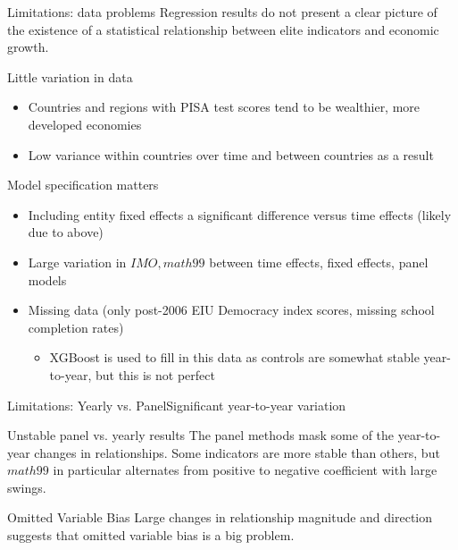 \documentclass[10pt]{beamer}
\begin{document}
\begin{frame}{Limitations: data problems}
    Regression results do not present a clear picture of the existence of a statistical relationship between elite indicators and economic growth.
    \begin{block}{Little variation in data}
        \begin{itemize}
            \item Countries and regions with PISA test scores tend to be wealthier, more developed economies
            \item Low variance within countries over time and between countries as a result
        \end{itemize}
    \end{block}

    \begin{block}{Model specification matters}
        \begin{itemize}
            \item Including entity fixed effects a significant difference versus time effects (likely due to above)
            \item Large variation in $IMO, math99$ between time effects, fixed effects, panel models
            \item Missing data (only post-2006 EIU Democracy index scores, missing school completion rates)
            \begin{itemize}
                \item XGBoost is used to fill in this data as controls are somewhat stable year-to-year, but this is not perfect
            \end{itemize}
        \end{itemize}

    \end{block}
    
\end{frame}

\begin{frame}{Limitations: Yearly vs. Panel}{Significant year-to-year variation}
    \begin{block}{Unstable panel vs. yearly results}
        The panel methods mask some of the year-to-year changes in relationships.
        Some indicators are more stable than others, but $math99$ in particular alternates from positive to negative coefficient with large swings.
    \end{block}

    \begin{block}{Omitted Variable Bias}
        Large changes in relationship magnitude and direction suggests that omitted variable bias is a big problem.
    \end{block}
    
    
\end{frame}
\end{document}

